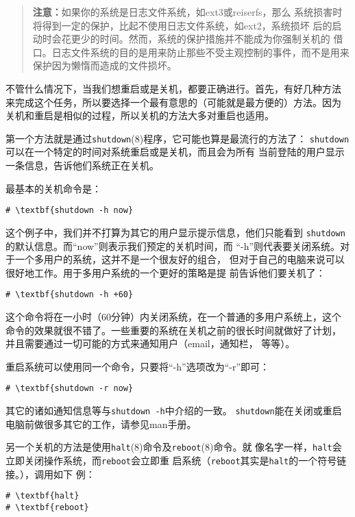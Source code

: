 \begin{quote}
  \textbf{注意：}如果你的系统是日志文件系统，如ext3或reiserfs，那么
  系统损害时将得到一定的保护，比起不使用日志文件系统，如ext2，系统损坏
  后的启动时会花更少的时间。然而，系统的保护措施并不能成为你强制关机的
  借口。日志文件系统的目的是用来防止那些不受主观控制的事件，而不是用来
  保护因为懒惰而造成的文件损坏。
\end{quote}

不管什么情况下，当我们想重启或是关机，都要正确进行。首先，有好几种方法
来完成这个任务，所以要选择一个最有意思的（可能就是最方便的）方法。因为
关机和重启是相似的过程，所以关机的方法大多对重启也适用。

第一个方法就是通过\texttt{shutdown}(8)程序，它可能也算是最流行的方法了：
\texttt{shutdown}可以在一个特定的时间对系统重启或是关机，而且会为所有
当前登陆的用户显示一条信息，告诉他们系统正在关机。

最基本的关机命令是：
\begin{Verbatim}[frame=single, commandchars=\\\{\}]
# \textbf{shutdown -h now}
\end{Verbatim}
这个例子中，我们并不打算为其它的用户显示提示信息，他们只能看到
\texttt{shutdown}的默认信息。而``now''则表示我们预定的关机时间，而
``-h''则代表要关闭系统。对于一个多用户的系统，这并不是一个很友好的组合，
但对于自己的电脑来说可以很好地工作。用于多用户系统的一个更好的策略是提
前告诉他们要关机了：
\begin{Verbatim}[frame=single, commandchars=\\\{\}]
# \textbf{shutdown -h +60}
\end{Verbatim}

这个命令将在一小时（60分钟）内关闭系统，在一个普通的多用户系统上，这个
命令的效果就很不错了。一些重要的系统在关机之前的很长时间就做好了计划，
并且需要通过一切可能的方式来通知用户（email，通知栏，
等等）。

重启系统可以使用同一个命令，只要将``-h''选项改为``-r''即可：
\begin{Verbatim}[frame=single, commandchars=\\\{\}]
# \textbf{shutdown -r now}
\end{Verbatim}

其它的诸如通知信息等与\texttt{shutdown -h}中介绍的一致。
\texttt{shutdown}能在关闭或重启电脑前做很多其它的工作，请参见man手册。

另一个关机的方法是使用\texttt{halt}(8)命令及\texttt{reboot}(8)命令。就
像名字一样，\texttt{halt}会立即关闭操作系统，而\texttt{reboot}会立即重
启系统（\texttt{reboot}其实是\texttt{halt}的一个符号链接。），调用如下
例：
\begin{Verbatim}[frame=single, commandchars=\\\{\}]
# \textbf{halt}
# \textbf{reboot}
\end{Verbatim}

